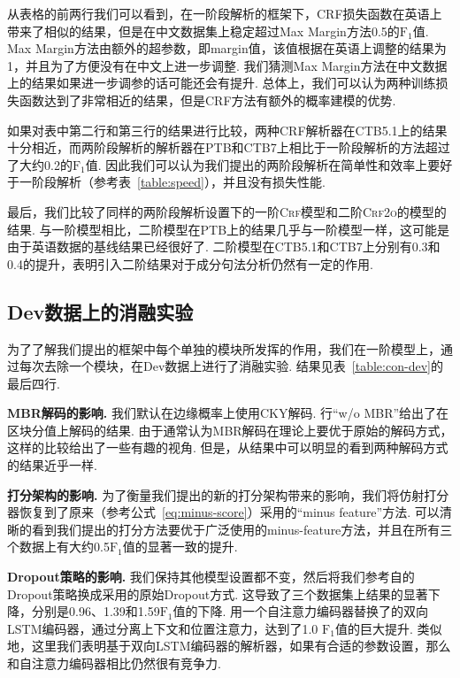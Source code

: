 从表格的前两行我们可以看到，在一阶段解析的框架下，CRF损失函数在英语上带来了相似的结果，但是在中文数据集上稳定超过Max Margin方法0.5的$\mathrm{F}_1$值.
Max Margin方法由额外的超参数，即margin值，该值根据在英语上调整的结果为1，并且为了方便没有在中文上进一步调整.
我们猜测Max Margin方法在中文数据上的结果如果进一步调参的话可能还会有提升.
总体上，我们可以认为两种训练损失函数达到了非常相近的结果，但是CRF方法有额外的概率建模的优势.

如果对表中第二行和第三行的结果进行比较，两种CRF解析器在CTB5.1上的结果十分相近，而两阶段解析的解析器在PTB和CTB7上相比于一阶段解析的方法超过了大约0.2的$\mathrm{F}_1$值.
因此我们可以认为我们提出的两阶段解析在简单性和效率上要好于一阶段解析（参考表~\ref{table:speed}），并且没有损失性能.

最后，我们比较了同样的两阶段解析设置下的一阶\textsc{Crf}模型和二阶\textsc{Crf2o}的模型的结果.
与一阶模型相比，二阶模型在PTB上的结果几乎与一阶模型一样，这可能是由于英语数据的基线结果已经很好了.
二阶模型在CTB5.1和CTB7上分别有0.3和0.4的提升，表明引入二阶结果对于成分句法分析仍然有一定的作用.

\subsection{Dev数据上的消融实验}

为了了解我们提出的框架中每个单独的模块所发挥的作用，我们在一阶模型上，通过每次去除一个模块，在Dev数据上进行了消融实验.
结果见表~\ref{table:con-dev}的最后四行.

\noindent\textbf{MBR解码的影响.}
我们默认在边缘概率上使用CKY解码.
行``w/o MBR''给出了在区块分值上解码的结果.
由于通常认为MBR解码在理论上要优于原始的解码方式，这样的比较给出了一些有趣的视角.
但是，从结果中可以明显的看到两种解码方式的结果近乎一样.

\noindent\textbf{打分架构的影响.}
为了衡量我们提出的新的打分架构带来的影响，我们将仿射打分器恢复到了原来\citep{stern-etal-2017-minimal}（参考公式~\ref{eq:minus-score}）采用的``minus feature''方法.
可以清晰的看到我们提出的打分方法要优于广泛使用的minus-feature方法，并且在所有三个数据上有大约0.5$\mathrm{F}_1$值的显著一致的提升.

\noindent\textbf{Dropout策略的影响.}
我们保持其他模型设置都不变，然后将我们参考自\citep{dozat-etal-2017-biaffine}的Dropout策略换成\citep{stern-etal-2017-minimal}采用的原始Dropout方式.
这导致了三个数据集上结果的显著下降，分别是0.96、1.39和1.59$\mathrm{F}_1$值的下降.
\citep{kitaev-klein-2018-constituency}用一个自注意力编码器替换了\citep{stern-etal-2017-minimal}的双向LSTM编码器，通过分离上下文和位置注意力，达到了1.0 $\mathrm{F}_1$值的巨大提升.
类似地，这里我们表明基于双向LSTM编码器的解析器，如果有合适的参数设置，那么和自注意力编码器相比仍然很有竞争力.

